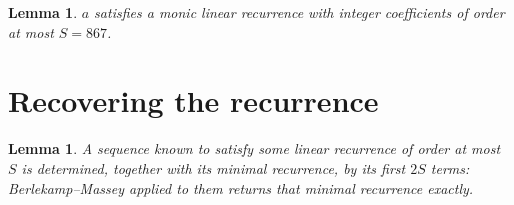 \documentclass[11pt,a4paper]{article}
\theoremstyle{plain}
\newtheorem{lemma}[theorem]{Lemma}
\theoremstyle{definition}
\begin{document}
\begin{lemma}\label{lem:cf}
$a$ satisfies a monic linear recurrence with integer coefficients of order at most $S=867$.
\end{lemma}

\section{Recovering the recurrence}

\begin{lemma}\label{lem:bm}
A sequence known to satisfy some linear recurrence of order at most $S$ is determined, together
with its minimal recurrence, by its first $2S$ terms: Berlekamp--Massey applied to them returns
that minimal recurrence exactly.
\end{lemma}
\end{document}
